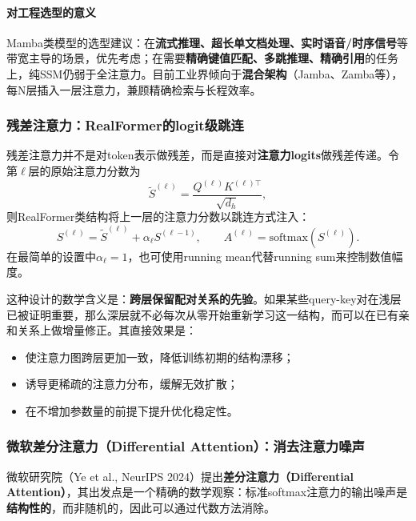 \documentclass[12pt,a4paper]{article}
\begin{document}
\paragraph{对工程选型的意义}

Mamba类模型的选型建议：在\textbf{流式推理、超长单文档处理、实时语音/时序信号}等带宽主导的场景，优先考虑；在需要\textbf{精确键值匹配、多跳推理、精确引用}的任务上，纯SSM仍弱于全注意力。目前工业界倾向于\textbf{混合架构}（Jamba、Zamba等），每N层插入一层注意力，兼顾精确检索与长程效率。

\subsubsection{残差注意力：RealFormer的logit级跳连}

残差注意力并不是对token表示做残差，而是直接对\textbf{注意力logits}做残差传递。令第$\ell$层的原始注意力分数为
\begin{equation}
\tilde{S}^{(\ell)} = \frac{Q^{(\ell)} K^{(\ell)\top}}{\sqrt{d_h}},
\end{equation}
则RealFormer类结构将上一层的注意力分数以跳连方式注入：
\begin{equation}
S^{(\ell)} = \tilde{S}^{(\ell)} + \alpha_\ell S^{(\ell-1)},\qquad
A^{(\ell)} = \text{softmax}(S^{(\ell)}).
\end{equation}
在最简单的设置中$\alpha_\ell = 1$，也可使用running mean代替running sum来控制数值幅度。

这种设计的数学含义是：\textbf{跨层保留配对关系的先验}。如果某些query-key对在浅层已被证明重要，那么深层就不必每次从零开始重新学习这一结构，而可以在已有亲和关系上做增量修正。其直接效果是：
\begin{itemize}
    \item 使注意力图跨层更加一致，降低训练初期的结构漂移；
    \item 诱导更稀疏的注意力分布，缓解无效扩散；
    \item 在不增加参数量的前提下提升优化稳定性。
\end{itemize}

\subsubsection{微软差分注意力（Differential Attention）：消去注意力噪声}
\label{sec:diff-attn}

微软研究院（Ye et al., NeurIPS 2024）提出\textbf{差分注意力（Differential Attention）}，其出发点是一个精确的数学观察：标准softmax注意力的输出噪声是\textbf{结构性的}，而非随机的，因此可以通过代数方法消除。
\end{document}
